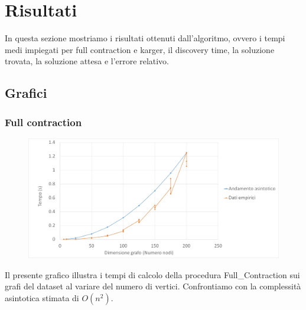 \chapter{Risultati\label{sec:risultati}}
\noindent In questa sezione mostriamo i risultati ottenuti dall'algoritmo, ovvero i tempi medi impiegati per full contraction e karger, il discovery time, la soluzione trovata, la soluzione attesa e l'errore relativo.

\section{Grafici\label{sec:grafici}}

\subsection{Full contraction\label{sec:fc}}
\begin{figure}[htp]
    \centering
    \includegraphics[width=\textwidth]{immagini/full_contraction.jpg}
\end{figure}
Il presente grafico illustra i tempi di calcolo della procedura Full\_Contraction sui grafi del dataset al variare del numero di vertici. Confrontiamo con la complessità asintotica stimata di \(O(n^{2})\).

\clearpage

